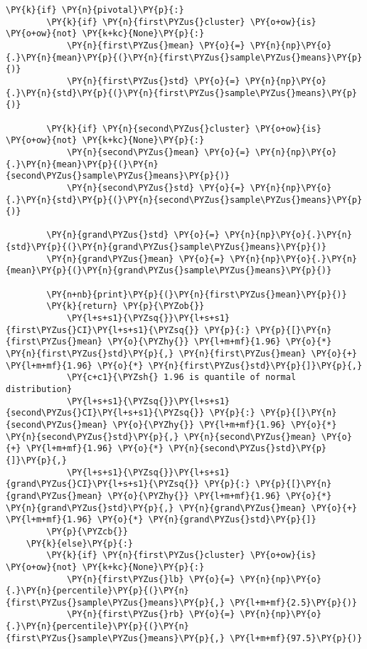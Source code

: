 \begin{tcolorbox}[breakable, size=fbox, boxrule=1pt, pad at break*=1mm,colback=cellbackground, colframe=cellborder]
\begin{Verbatim}[commandchars=\\\{\}]
    \PY{k}{if} \PY{n}{pivotal}\PY{p}{:} 
        \PY{k}{if} \PY{n}{first\PYZus{}cluster} \PY{o+ow}{is} \PY{o+ow}{not} \PY{k+kc}{None}\PY{p}{:}
            \PY{n}{first\PYZus{}mean} \PY{o}{=} \PY{n}{np}\PY{o}{.}\PY{n}{mean}\PY{p}{(}\PY{n}{first\PYZus{}sample\PYZus{}means}\PY{p}{)}
            \PY{n}{first\PYZus{}std} \PY{o}{=} \PY{n}{np}\PY{o}{.}\PY{n}{std}\PY{p}{(}\PY{n}{first\PYZus{}sample\PYZus{}means}\PY{p}{)}
            
        \PY{k}{if} \PY{n}{second\PYZus{}cluster} \PY{o+ow}{is} \PY{o+ow}{not} \PY{k+kc}{None}\PY{p}{:}
            \PY{n}{second\PYZus{}mean} \PY{o}{=} \PY{n}{np}\PY{o}{.}\PY{n}{mean}\PY{p}{(}\PY{n}{second\PYZus{}sample\PYZus{}means}\PY{p}{)}
            \PY{n}{second\PYZus{}std} \PY{o}{=} \PY{n}{np}\PY{o}{.}\PY{n}{std}\PY{p}{(}\PY{n}{second\PYZus{}sample\PYZus{}means}\PY{p}{)}
        
        \PY{n}{grand\PYZus{}std} \PY{o}{=} \PY{n}{np}\PY{o}{.}\PY{n}{std}\PY{p}{(}\PY{n}{grand\PYZus{}sample\PYZus{}means}\PY{p}{)}
        \PY{n}{grand\PYZus{}mean} \PY{o}{=} \PY{n}{np}\PY{o}{.}\PY{n}{mean}\PY{p}{(}\PY{n}{grand\PYZus{}sample\PYZus{}means}\PY{p}{)}
        
        \PY{n+nb}{print}\PY{p}{(}\PY{n}{first\PYZus{}mean}\PY{p}{)}
        \PY{k}{return} \PY{p}{\PYZob{}}
            \PY{l+s+s1}{\PYZsq{}}\PY{l+s+s1}{first\PYZus{}CI}\PY{l+s+s1}{\PYZsq{}} \PY{p}{:} \PY{p}{[}\PY{n}{first\PYZus{}mean} \PY{o}{\PYZhy{}} \PY{l+m+mf}{1.96} \PY{o}{*} \PY{n}{first\PYZus{}std}\PY{p}{,} \PY{n}{first\PYZus{}mean} \PY{o}{+} \PY{l+m+mf}{1.96} \PY{o}{*} \PY{n}{first\PYZus{}std}\PY{p}{]}\PY{p}{,} 
            \PY{c+c1}{\PYZsh{} 1.96 is quantile of normal distribution}
            \PY{l+s+s1}{\PYZsq{}}\PY{l+s+s1}{second\PYZus{}CI}\PY{l+s+s1}{\PYZsq{}} \PY{p}{:} \PY{p}{[}\PY{n}{second\PYZus{}mean} \PY{o}{\PYZhy{}} \PY{l+m+mf}{1.96} \PY{o}{*} \PY{n}{second\PYZus{}std}\PY{p}{,} \PY{n}{second\PYZus{}mean} \PY{o}{+} \PY{l+m+mf}{1.96} \PY{o}{*} \PY{n}{second\PYZus{}std}\PY{p}{]}\PY{p}{,}
            \PY{l+s+s1}{\PYZsq{}}\PY{l+s+s1}{grand\PYZus{}CI}\PY{l+s+s1}{\PYZsq{}} \PY{p}{:} \PY{p}{[}\PY{n}{grand\PYZus{}mean} \PY{o}{\PYZhy{}} \PY{l+m+mf}{1.96} \PY{o}{*} \PY{n}{grand\PYZus{}std}\PY{p}{,} \PY{n}{grand\PYZus{}mean} \PY{o}{+} \PY{l+m+mf}{1.96} \PY{o}{*} \PY{n}{grand\PYZus{}std}\PY{p}{]}
        \PY{p}{\PYZcb{}}
    \PY{k}{else}\PY{p}{:}
        \PY{k}{if} \PY{n}{first\PYZus{}cluster} \PY{o+ow}{is} \PY{o+ow}{not} \PY{k+kc}{None}\PY{p}{:}
            \PY{n}{first\PYZus{}lb} \PY{o}{=} \PY{n}{np}\PY{o}{.}\PY{n}{percentile}\PY{p}{(}\PY{n}{first\PYZus{}sample\PYZus{}means}\PY{p}{,} \PY{l+m+mf}{2.5}\PY{p}{)}
            \PY{n}{first\PYZus{}rb} \PY{o}{=} \PY{n}{np}\PY{o}{.}\PY{n}{percentile}\PY{p}{(}\PY{n}{first\PYZus{}sample\PYZus{}means}\PY{p}{,} \PY{l+m+mf}{97.5}\PY{p}{)}
            

\end{Verbatim}
\end{tcolorbox}
